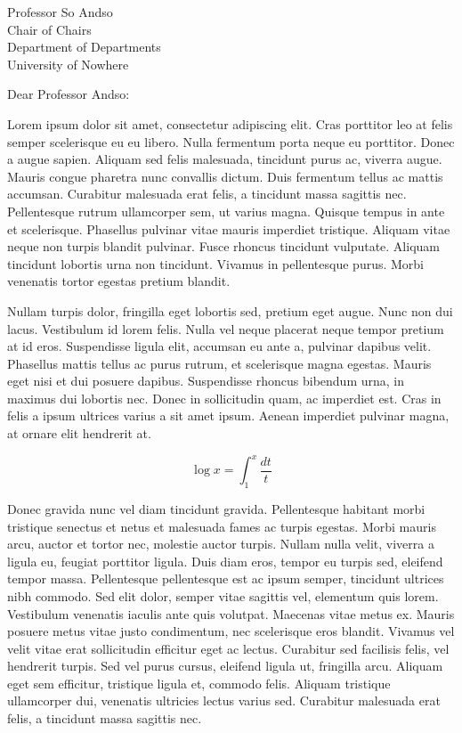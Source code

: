 \documentclass[letterpaper]{mscsletter}
\begin{document}
\begin{letter}{
Professor So Andso\\
Chair of Chairs\\
Department of Departments\\
University of Nowhere\\
}

\opening{Dear Professor Andso:}

Lorem ipsum dolor sit amet, consectetur adipiscing elit. Cras
porttitor leo at felis semper scelerisque eu eu libero. Nulla
fermentum porta neque eu porttitor. Donec a augue sapien. Aliquam sed
felis malesuada, tincidunt purus ac, viverra augue. Mauris congue
pharetra nunc convallis dictum. Duis fermentum tellus ac mattis
accumsan. Curabitur malesuada erat felis, a tincidunt massa sagittis
nec. Pellentesque rutrum ullamcorper sem, ut varius magna. Quisque
tempus in ante et scelerisque. Phasellus pulvinar vitae mauris
imperdiet tristique. Aliquam vitae neque non turpis blandit
pulvinar. Fusce rhoncus tincidunt vulputate. Aliquam tincidunt
lobortis urna non tincidunt. Vivamus in pellentesque purus. Morbi
venenatis tortor egestas pretium blandit.

Nullam turpis dolor, fringilla eget lobortis sed, pretium eget
augue. Nunc non dui lacus. Vestibulum id lorem felis. Nulla vel neque
placerat neque tempor pretium at id eros. Suspendisse ligula elit,
accumsan eu ante a, pulvinar dapibus velit. Phasellus mattis tellus ac
purus rutrum, et scelerisque magna egestas. Mauris eget nisi et dui
posuere dapibus. Suspendisse rhoncus bibendum urna, in maximus dui
lobortis nec. Donec in sollicitudin quam, ac imperdiet est. Cras in
felis a ipsum ultrices varius a sit amet ipsum. Aenean imperdiet
pulvinar magna, at ornare elit hendrerit at.

$$\log x = \int_1^x\frac{dt}{t}$$

Donec gravida nunc vel diam tincidunt gravida. Pellentesque habitant
morbi tristique senectus et netus et malesuada fames ac turpis
egestas. Morbi mauris arcu, auctor et tortor nec, molestie auctor
turpis. Nullam nulla velit, viverra a ligula eu, feugiat porttitor
ligula. Duis diam eros, tempor eu turpis sed, eleifend tempor
massa. Pellentesque pellentesque est ac ipsum semper, tincidunt
ultrices nibh commodo. Sed elit dolor, semper vitae sagittis vel,
elementum quis lorem. Vestibulum venenatis iaculis ante quis
volutpat. Maecenas vitae metus ex. Mauris posuere metus vitae justo
condimentum, nec scelerisque eros blandit. Vivamus vel velit vitae
erat sollicitudin efficitur eget ac lectus. Curabitur sed facilisis
felis, vel hendrerit turpis. Sed vel purus cursus, eleifend ligula ut,
fringilla arcu. Aliquam eget sem efficitur, tristique ligula et,
commodo felis. Aliquam tristique ullamcorper dui, venenatis ultricies
lectus varius sed. Curabitur malesuada erat felis, a tincidunt massa sagittis
nec.


\end{letter}
\end{document}
